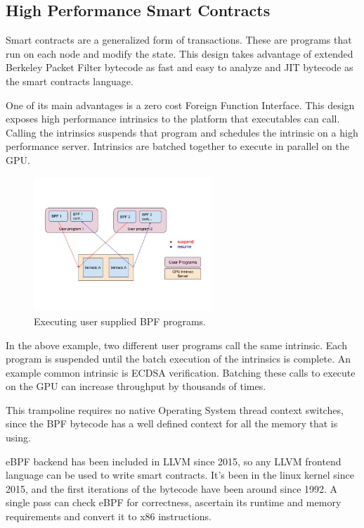 \documentclass[12pt]{article}
\begin{document}
\subsection{High Performance Smart Contracts}

Smart contracts are a generalized form of transactions.  These are programs that run on each node and modify the state.  This design takes advantage of extended Berkeley Packet Filter bytecode as fast and easy to analyze and JIT bytecode as the smart contracts language.

One of its main advantages is a zero cost Foreign Function Interface. This design exposes high performance intrinsics to the platform that executables can call.  Calling the intrinsics suspends that program and schedules the intrinsic on a high performance server.  Intrinsics are batched together to execute in parallel on the GPU.

\begin{figure}
  \begin{center}
    \centering
    \includegraphics[width=0.6\textwidth]{figures/fig_11.png}
    \caption[Fig 11]{Executing user supplied BPF programs.\label{fig_11}}
  \end{center}
  \end{figure}

In the above example, two different user programs call the same intrinsic.  Each program is suspended until the batch execution of the intrinsics is complete.  An example common intrinsic is ECDSA verification.  Batching these calls to execute on the GPU can increase throughput by thousands of times.

This trampoline requires no native Operating System thread context switches, since the BPF bytecode has a well defined context for all the memory that is using.

eBPF backend has been included in LLVM since 2015, so any LLVM frontend language can be used to write smart contracts.  It’s been in the linux kernel since 2015, and the first iterations of the bytecode have been around since 1992.  A single pass can check eBPF for correctness, ascertain its runtime and memory requirements and convert it to x86 instructions.
\end{document}
